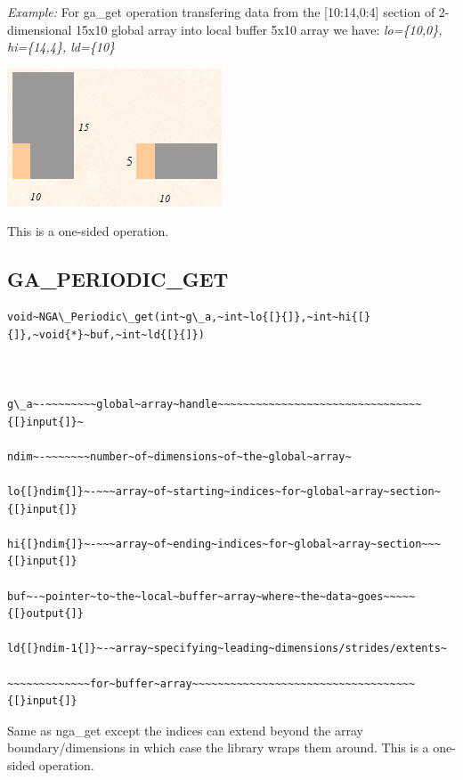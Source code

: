 \emph{Example:} For ga\_get operation transfering data from the {[}10:14,0:4{]}
section of 2-dimensional 15x10 global array into local buffer 5x10
array we have: \emph{lo=\{10,0\}, hi=\{14,4\}, ld=\{10\} }

\includegraphics{GA_Get}

This is a one-sided operation.


\subsection*{\label{sub:GA_PERIODIC_GET}GA\_PERIODIC\_GET}
\begin{verbatim}
void~NGA\_Periodic\_get(int~g\_a,~int~lo{[}{]},~int~hi{[}{]},~void{*}~buf,~int~ld{[}{]})



g\_a~-~~~~~~~~global~array~handle~~~~~~~~~~~~~~~~~~~~~~~~~~~~~~~~{[}input{]}~

ndim~-~~~~~~~number~of~dimensions~of~the~global~array~

lo{[}ndim{]}~-~~~array~of~starting~indices~for~global~array~section~{[}input{]}

hi{[}ndim{]}~-~~~array~of~ending~indices~for~global~array~section~~~{[}input{]}

buf~-~pointer~to~the~local~buffer~array~where~the~data~goes~~~~~{[}output{]}

ld{[}ndim-1{]}~-~array~specifying~leading~dimensions/strides/extents~

~~~~~~~~~~~~~for~buffer~array~~~~~~~~~~~~~~~~~~~~~~~~~~~~~~~~~~~{[}input{]}
\end{verbatim}
Same as nga\_get except the indices can extend beyond the array boundary/dimensions
in which case the library wraps them around. This is a one-sided operation. 


